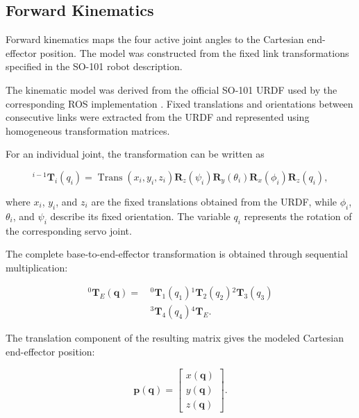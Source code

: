 \subsection{Forward Kinematics}

Forward kinematics maps the four active joint angles to the Cartesian end-effector position. The model was constructed from the fixed link transformations specified in the SO-101 robot description.

The kinematic model was derived from the official SO-101 URDF used by the corresponding ROS implementation \cite{so101_urdf}. Fixed translations and orientations between consecutive links were extracted from the URDF and represented using homogeneous transformation matrices.

For an individual joint, the transformation can be written as

\begin{equation}
    {}^{i-1}\mathbf{T}_{i}(q_i) =
    \operatorname{Trans}(x_i,y_i,z_i)
    \mathbf{R}_{z}(\psi_i)
    \mathbf{R}_{y}(\theta_i)
    \mathbf{R}_{x}(\phi_i)
    \mathbf{R}_{z}(q_i),
    \label{eq:individual_transform}
\end{equation}

where \(x_i\), \(y_i\), and \(z_i\) are the fixed translations obtained from the URDF, while \(\phi_i\), \(\theta_i\), and \(\psi_i\) describe its fixed orientation. The variable \(q_i\) represents the rotation of the corresponding servo joint.

The complete base-to-end-effector transformation is obtained through sequential multiplication:

\begin{equation}
\begin{split}
    {}^{0}\mathbf{T}_{E}(\mathbf{q}) =\,
    &{}^{0}\mathbf{T}_{1}(q_1)
    {}^{1}\mathbf{T}_{2}(q_2)
    {}^{2}\mathbf{T}_{3}(q_3) \\
    &{}^{3}\mathbf{T}_{4}(q_4)
    {}^{4}\mathbf{T}_{E}.
\end{split}
\label{eq:forward_kinematic_chain}
\end{equation}

The translation component of the resulting matrix gives the modeled Cartesian end-effector position:

\begin{equation}
    \mathbf{p}(\mathbf{q}) =
    \begin{bmatrix}
        x(\mathbf{q}) \\
        y(\mathbf{q}) \\
        z(\mathbf{q})
    \end{bmatrix}.
    \label{eq:end_effector_position}
\end{equation}

